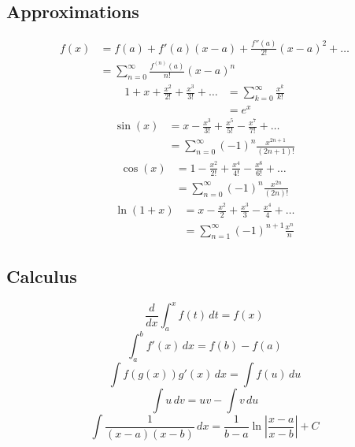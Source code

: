 \subsection{Approximations}
\begin{align}
    f(x) & = f(a) + f'(a)(x - a) + \frac{f''(a)}{2!}(x - a)^2 + \dots \\
         & = \sum_{n=0}^{\infty} \frac{f^{(n)}(a)}{n!}(x - a)^n
\end{align}
\begin{align}
    1 + x + \frac{x^2}{2!} + \frac{x^3}{3!} + \dots & = \sum_{k=0}^{\infty} \frac{x^k}{k!} \\
                                                    & = e^x
\end{align}
\begin{align}
    \sin(x) & = x - \frac{x^3}{3!} + \frac{x^5}{5!} - \frac{x^7}{7!} + \dots \\
            & = \sum_{n=0}^{\infty} (-1)^n \frac{x^{2n+1}}{(2n+1)!}
\end{align}
\begin{align}
    \cos(x) & = 1 - \frac{x^2}{2!} + \frac{x^4}{4!} - \frac{x^6}{6!} + \dots \\
            & = \sum_{n=0}^{\infty} (-1)^n \frac{x^{2n}}{(2n)!}
\end{align}
\begin{align}
    \ln(1 + x) & = x - \frac{x^2}{2} + \frac{x^3}{3} - \frac{x^4}{4} + \dots \\
               & = \sum_{n=1}^{\infty} (-1)^{n+1} \frac{x^n}{n}
\end{align}

\subsection{Calculus}
\begin{equation}
    \frac{d}{dx} \int_{a}^{x} f(t)\,dt = f(x)
\end{equation}
\begin{equation}
    \int_{a}^{b} f'(x)\,dx = f(b) - f(a)
\end{equation}
\begin{equation}
    \int f(g(x))g'(x)\,dx = \int f(u)\,du
\end{equation}
\begin{equation}
    \int u\,dv = uv - \int v\,du
\end{equation}
\begin{equation}
    \int \frac{1}{(x-a)(x-b)}\,dx = \frac{1}{b-a} \ln\left|\frac{x-a}{x-b}\right| + C
\end{equation}

